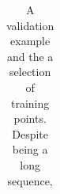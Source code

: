 \begin{table}
\begin{center}
{\begin{tabular}{l}
\end{tabular}
}
\caption{A validation example and the a selection of training points. Despite being a long sequence, }
\label{table:example_plausible_training}
\end{center}
\end{table}









